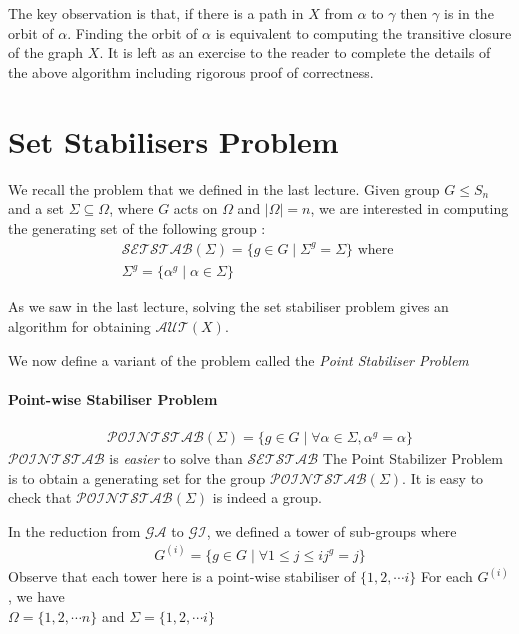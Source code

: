 The key observation is that, if there is a path in $X$ from $\alpha$ to $\gamma$ then $\gamma$ is in the orbit of $\alpha$.
Finding the orbit of $\alpha$ is equivalent to computing the 
transitive closure of the graph $X$. It is left as an exercise to the reader to complete the details of the above algorithm including rigorous proof of correctness.

\section{Set Stabilisers Problem}

We recall the problem that we defined in the last lecture. Given group $G \leq S_n$ and a set $\Sigma \subseteq \Omega$, where $G$ acts on $\Omega$ and $|\Omega| = n$, we are interested in computing the generating set of the following group :
\begin{align}
\mathcal{SETSTAB} (\Sigma) = \lbrace g \in G \mid \Sigma^g = \Sigma \rbrace \text{ where }\\
\Sigma^g = \lbrace \alpha^g \mid \alpha \in \Sigma \rbrace 
\end{align}

As we saw in the last lecture, solving the set stabiliser problem gives an algorithm for obtaining $\mathcal{AUT}(X)$.

We now define a variant of the problem called the \textit{Point Stabiliser Problem}

\paragraph{Point-wise Stabiliser Problem}
\begin{align}
\mathcal{POINTSTAB} (\Sigma) = \lbrace g \in G \mid \forall \alpha \in \Sigma, \alpha^g = \alpha \rbrace
\end{align}
$\mathcal{POINTSTAB}$ is \emph{easier} to solve than $\mathcal{SETSTAB}$
The Point Stabilizer Problem is to obtain a generating set for the
group $\mathcal{POINTSTAB} (\Sigma)$. It is easy to check that $\mathcal{POINTSTAB} (\Sigma)$ is indeed a group.

In the reduction from $\mathcal{GA}$ to $\mathcal{GI}$, we defined
a tower of sub-groups  where
\begin{align}
G^{(i)} = \lbrace g \in G \mid \forall 1 \leq j \leq i j^g = j \rbrace 
\end{align}
Observe that each tower here is a point-wise stabiliser of $\lbrace 1, 2, \cdots i \rbrace$
For each $G^{(i)}$, we have \\
$\Omega = \lbrace 1, 2, \cdots n \rbrace$  and $\Sigma = \lbrace 1, 2, \cdots i \rbrace$ 

